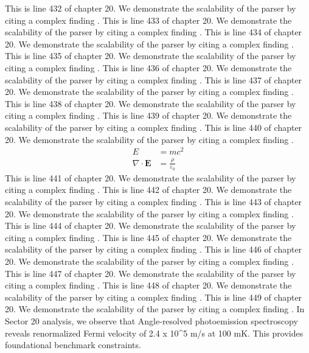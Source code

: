 This is line 432 of chapter 20. We demonstrate the scalability of the parser by citing a complex finding \cite{ref20_432}.
This is line 433 of chapter 20. We demonstrate the scalability of the parser by citing a complex finding \cite{ref20_433}.
This is line 434 of chapter 20. We demonstrate the scalability of the parser by citing a complex finding \cite{ref20_434}.
This is line 435 of chapter 20. We demonstrate the scalability of the parser by citing a complex finding \cite{ref20_435}.
This is line 436 of chapter 20. We demonstrate the scalability of the parser by citing a complex finding \cite{ref20_436}.
This is line 437 of chapter 20. We demonstrate the scalability of the parser by citing a complex finding \cite{ref20_437}.
This is line 438 of chapter 20. We demonstrate the scalability of the parser by citing a complex finding \cite{ref20_438}.
This is line 439 of chapter 20. We demonstrate the scalability of the parser by citing a complex finding \cite{ref20_439}.
This is line 440 of chapter 20. We demonstrate the scalability of the parser by citing a complex finding \cite{ref20_440}.
\begin{align*}
  E &= mc^2 \\
  \nabla \cdot \mathbf{E} &= \frac{\rho}{\varepsilon_0}
\end{align*}
This is line 441 of chapter 20. We demonstrate the scalability of the parser by citing a complex finding \cite{ref20_441}.
This is line 442 of chapter 20. We demonstrate the scalability of the parser by citing a complex finding \cite{ref20_442}.
This is line 443 of chapter 20. We demonstrate the scalability of the parser by citing a complex finding \cite{ref20_443}.
This is line 444 of chapter 20. We demonstrate the scalability of the parser by citing a complex finding \cite{ref20_444}.
This is line 445 of chapter 20. We demonstrate the scalability of the parser by citing a complex finding \cite{ref20_445}.
This is line 446 of chapter 20. We demonstrate the scalability of the parser by citing a complex finding \cite{ref20_446}.
This is line 447 of chapter 20. We demonstrate the scalability of the parser by citing a complex finding \cite{ref20_447}.
This is line 448 of chapter 20. We demonstrate the scalability of the parser by citing a complex finding \cite{ref20_448}.
This is line 449 of chapter 20. We demonstrate the scalability of the parser by citing a complex finding \cite{ref20_449}.
In Sector 20 analysis, we observe that Angle-resolved photoemission spectroscopy reveals renormalized Fermi velocity of 2.4 x 10^5 m/s at 100 mK. This provides foundational benchmark constraints.
